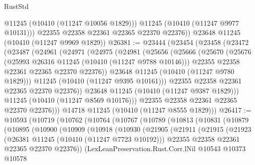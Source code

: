 \begin{lexlean}{RustStd}
\begin{coremodule}
            @11245
            (@10410 (@11247 @10056 @1829)))
          @11245
          (@10410 (@11247 @9977 @10131)))
        @22355
        @22358
        @22361
        @22365
        @22370
        @22376))
    @23648
    @11245
    (@10410 (@11247 @9969 @1829))
@26381 := @23444
    (@23454
      (@23458
        (@23472
          (@23487
            (@24961
              (@24971
                (@24975
                  (@24981
                    (@25656
                      (@25666
                        (@25670
                          (@25676
                            (@25993 @26316 @11245 (@10410 (@11247 @9788 @10146)))
                            @22355
                            @22358
                            @22361
                            @22365
                            @22370
                            @22376))
                        @23648
                        @11245
                        (@10410 (@11247 @9780 @1829)))
                      @11245
                      (@10410 (@11247 @9395 @10161)))
                    @22355
                    @22358
                    @22361
                    @22365
                    @22370
                    @22376))
                @23648
                @11245
                (@10410 (@11247 @9387 @1829)))
              @11245
              (@10410 (@11247 @8569 @10176)))
            @22355
            @22358
            @22361
            @22365
            @22370
            @22376)))
      @14718
      @11245
      (@10410 (@11247 @8555 @1829)))
@26417 := @10593
    (@10719
      (@10762
        (@10764
          (@10767
            (@10789
              (@10813
                (@10831
                  (@10879
                    (@10895
                      (@10900
                        (@10909
                          (@10918
                            (@10930
                              (@21905
                                (@21911
                                  (@21915
                                    (@21923
                                      (@26381 @11245 (@10410 (@11247 @7723 @10192)))
                                      @22355
                                      @22358
                                      @22361
                                      @22365
                                      @22370
                                      @22376))
                                  (LexLeanPreservation.Rust.Corr.lNil
                                    @10543
                                    @10373
                                    @10578

\end{coremodule}
\end{lexlean}
